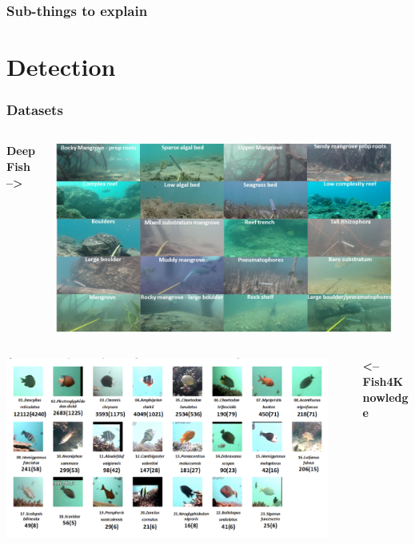\documentclass[serif]{beamer}  %
\begin{document}
\begin{frame}
\frametitle{Sub-things to explain}
\end{frame}

\section{Detection}

\begin{frame}
\frametitle{Datasets}
\begin{columns}
\begin{column}{0.5\textwidth}
	\centering
	\textbf{DeepFish  --> }\\
\end{column}

\begin{column}{0.5\textwidth}
	\centering
	\includegraphics[width=0.95\textwidth]{images/deepfish.png}
\end{column}
\end{columns}

\vspace{1cm}

\begin{columns}
\begin{column}{0.5\textwidth}
	\centering
	\includegraphics[width=0.95\textwidth]{images/f4k.png}	
\end{column}

\begin{column}{0.5\textwidth}
	\centering
	\textbf{<--  Fish4Knowledge}
\end{column}
\end{columns}
\end{frame}
\end{document}
